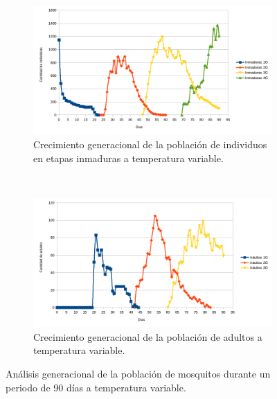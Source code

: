 \begin{figure}[!htbp]
    \centering
    \begin{subfigure}[b]{0.45\textwidth}
        \includegraphics[width=\textwidth]{../book/capitulo-6/graphics/temp-var-90-generacion-inmaduras.png}
        \caption{\label{fig:temp-var-inmaduras-generacion}Crecimiento generacional de la población de individuos en etapas inmaduras a temperatura variable.}
    \end{subfigure}
    ~~~~
    \begin{subfigure}[b]{0.45\textwidth}
        \includegraphics[width=\textwidth]{../book/capitulo-6/graphics/temp-var-90-generacion-adultos.png}
        \caption{\label{fig:temp-var-adultos-generacion}Crecimiento generacional de la población de adultos a temperatura variable.}
    \end{subfigure}

    \caption{\label{fig:temp-var-generacion} Análisis generacional de la población de mosquitos durante un periodo de 90 días a temperatura variable.}
\end{figure}
